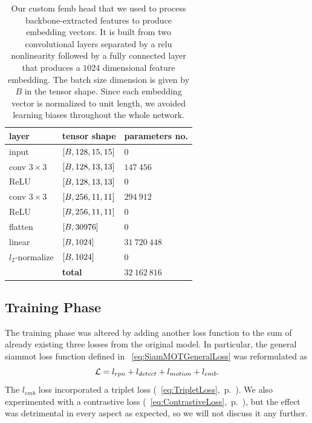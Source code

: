\begin{table}[!t]
    \centering
    \begin{tabular}{lll}
        \toprule
        \textbf{layer}    & \textbf{tensor shape}        & \textbf{parameters no.} \\
        \midrule
        input             & $\left[ {B, 128, 15, 15} \right]$ & $0$                     \\
        \midrule
        conv $3 \times 3$ & $\left[ {B, 128, 13, 13} \right]$ & $147\ 456$              \\
        ReLU              & $\left[ {B, 128, 13, 13} \right]$ & $0$                     \\
        \midrule
        conv $3 \times 3$ & $\left[ {B, 256, 11, 11} \right]$ & $294\ 912$              \\
        ReLU              & $\left[ {B, 256, 11, 11} \right]$ & $0$                     \\
        \midrule
        flatten           & $\left[ {B, 30976} \right]$       & $0$                     \\
        linear            & $\left[ {B, 1024} \right]$        & $31\ 720\ 448$          \\
        \midrule
        $l_2$-normalize   & $\left[ {B, 1024} \right]$        & $0$                     \\
        \bottomrule
                          & \textbf{total}               & $32\ 162\ 816$          \\
        \cline{2-3}
    \end{tabular}
    \caption[\gls{femb} head]{Our custom \gls{femb} head that we used to process backbone-extracted features to produce embedding vectors. It is built from two convolutional layers separated by a \gls{relu} nonlinearity followed by a fully connected layer that produces a $1024$ dimensional feature embedding. The batch size dimension is given by $B$ in the tensor shape. Since each embedding vector is normalized to unit length, we avoided learning biases throughout the whole network.}
    \label{tab:FeatureEmbeddingHead}
\end{table}

\subsection{Training Phase}

The training phase was altered by adding another loss function to the sum of already existing three losses from the original model. In particular, the general \gls{siammot} loss function defined in \eqtext{}~\ref{eq:SiamMOTGeneralLoss} was reformulated as
\begin{equation}
    \label{eq:SiamMOTFeatureEmbLoss}
    \mathcal{L} = l_{rpn} + l_{detect} + l_{motion} + l_{emb}.
\end{equation}
The $l_{emb}$ loss incorporated a triplet loss (\eqtext{}~\ref{eq:TripletLoss},~p.~\pageref{eq:TripletLoss}). We also experimented with a contrastive loss (\eqtext{}~\ref{eq:ContrastiveLoss},~p.~\pageref{eq:ContrastiveLoss}), but the effect was detrimental in every aspect as expected, so we will not discuss it any further.

